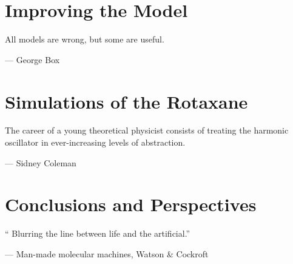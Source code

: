 \documentclass[11pt,a4paper,twoside]{vutinfth}
\newcommand*\cleartoleftpage{%
  \clearpage
  \ifodd\value{page}\hbox{}\newpage\fi
}
\newcounter{theo}[section] \setcounter{theo}{0}
\begin{document}
\cleardoublepage
\chapter{Improving the Model}
\epigraph{All models are wrong, but some are useful.}
{--- \textup{George Box}}%



 \cleardoublepage

\chapter{Simulations of the Rotaxane}
\vspace{0.5cm}
\epigraphfontsize{\small\itshape}
\epigraph{The career of a young theoretical physicist consists of treating the harmonic
oscillator in ever-increasing levels of abstraction.}
{--- \textup{Sidney Coleman}}




\cleardoublepage
\chapter{Conclusions and Perspectives}
\vspace{0.5cm}
\epigraphfontsize{\small\itshape}
\epigraph{“ Blurring the line between life and the artificial.”}
{--- Man-made molecular machines, \textup{Watson \& Cockroft}}%




\begin{appendices}

\cleardoublepage
\end{appendices}

\newpage
\thispagestyle{empty}
\mbox{}
\newpage


\linespread{0.816}
{\small \printbibliography}
\cleardoublepage
\linespread{1}


\cleardoublepage
\thispagestyle{empty}

\cleartoleftpage{} %

\end{document}
